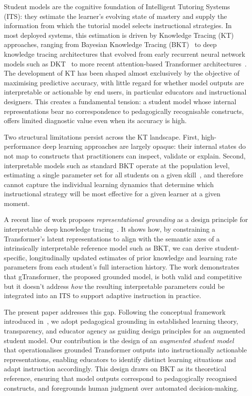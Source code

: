 \documentclass[runningheads]{llncs}
\begin{document}
Student models are the cognitive foundation of Intelligent Tutoring Systems (ITS): they estimate the learner's evolving state of mastery and supply the information from which the tutorial model selects instructional strategies. In most deployed systems, this estimation is driven by Knowledge Tracing (KT) approaches, ranging from Bayesian Knowledge Tracing (BKT)~\cite{corbett1994knowledge} to deep knowledge tracing architectures that evolved from early recurrent neural network models such as DKT~\cite{piech2015deep} to more recent attention-based Transformer architectures~\cite{ghosh2020context}. The development of KT has been shaped almost exclusively by the objective of maximising predictive accuracy, with little regard for whether model outputs are interpretable or actionable by end users, in particular educators and instructional designers. This creates a fundamental tension: a student model whose internal representations bear no correspondence to pedagogically recognisable constructs, offers limited diagnostic value even when its accuracy is high.

Two structural limitations persist across the KT landscape. First, high-performance deep learning approaches are largely opaque: their internal states do not map to constructs that practitioners can inspect, validate or explain. Second, interpretable models such as standard BKT operate at the population level, estimating a single parameter set for all students on a given skill~\cite{yudelson2013individualized}, and therefore cannot capture the individual learning dynamics that determine which instructional strategy will be most effective for a given learner at a given moment.

A recent line of work proposes \textit{representational grounding} as a design principle for interpretable deep knowledge tracing~\cite{labra2026theory}. It shows how, by constraining a Transformer's latent representations to align with the semantic axes of a intrinsically interpretable reference model such as BKT, we can derive student-specific, longitudinally updated estimates of prior knowledge and learning rate parameters from each student's full interaction history. The work demonstrates that gTransformer, the proposed grounded model, is both valid and competitive but it doesn't address \emph{how} the resulting interpretable parameters could be integrated into an ITS to support adaptive instruction in practice.


The present paper addresses this gap. Following the conceptual framework introduced in~\cite{labra2026theory}, we adopt pedagogical grounding in established learning theory, transparency, and educator agency as guiding design principles for an augmented student model. Our contribution is the design of an \textit{augmented student model} that operationalises grounded Transformer outputs into instructionally actionable representations, enabling educators to identify distinct learning situations and adapt instruction accordingly. This design draws on BKT as its theoretical reference, ensuring that model outputs correspond to pedagogically recognised constructs, and foregrounds human judgment over automated decision-making.
\end{document}
